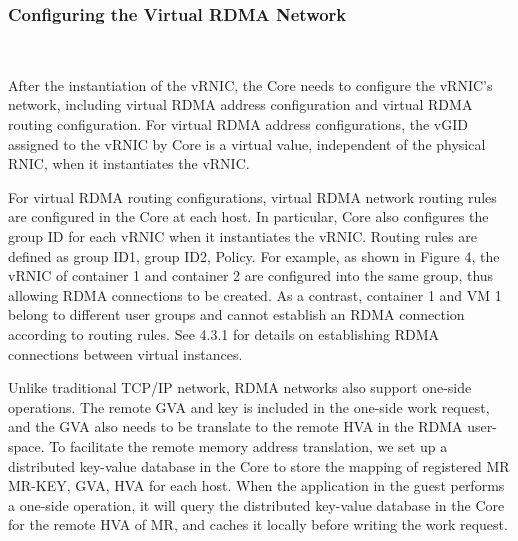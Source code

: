 \subsubsection{\textbf{Configuring the Virtual RDMA Network}}
\
\noindent

After the instantiation of the vRNIC, the \sys Core needs to configure the vRNIC's network, including virtual RDMA address configuration and virtual RDMA routing configuration.
For virtual RDMA address configurations, the vGID assigned to the vRNIC by \sys Core is a virtual value, independent of the physical RNIC, when it instantiates the vRNIC.


For virtual RDMA routing configurations, virtual RDMA network routing rules are configured in the \sys Core at each host. In particular, \sys Core also configures the group ID for each vRNIC when it instantiates the vRNIC. Routing rules are defined as {group ID1, group ID2, Policy}. For example, as shown in Figure 4, the vRNIC of container 1 and container 2 are configured into the same group, thus allowing RDMA connections to be created. As a contrast, container 1 and VM 1 belong to different user groups and cannot establish an RDMA connection according to routing rules. See 4.3.1 for details on establishing RDMA connections between virtual instances.


Unlike traditional TCP/IP network, RDMA networks also support one-side operations. The remote GVA and key is included in the one-side work request, and the GVA also needs to be translate to the remote HVA in the RDMA user-space. To facilitate the remote memory address translation, we set up a distributed key-value database in the \sys Core to store the mapping of registered MR {MR-KEY, GVA, HVA} for each host. When the application in the guest performs a one-side operation, it will query the distributed key-value database in the \sys Core for the remote HVA of MR, and caches it locally before writing the work request.

